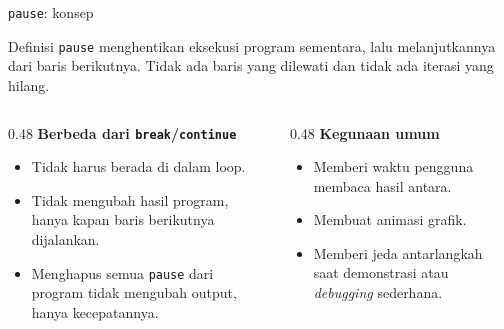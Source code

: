 \documentclass[aspectratio=169,10pt]{beamer}
\newcommand{\kode}[1]{\texttt{#1}}
\begin{document}
\begin{frame}[fragile]{\kode{pause}: konsep}
  \begin{block}{Definisi}
    \kode{pause} menghentikan eksekusi program \alert{sementara}, lalu melanjutkannya dari baris berikutnya.
    Tidak ada baris yang dilewati dan tidak ada iterasi yang hilang.
  \end{block}
  \vspace{4pt}
  \begin{columns}[T]
    \begin{column}{0.48\textwidth}
      \textbf{Berbeda dari \kode{break}/\kode{continue}}
      \begin{itemize}
        \item Tidak harus berada di dalam loop.
        \item Tidak mengubah \alert{hasil} program, hanya \alert{kapan} baris berikutnya dijalankan.
        \item Menghapus semua \kode{pause} dari program tidak mengubah output, hanya kecepatannya.
      \end{itemize}
    \end{column}
    \begin{column}{0.48\textwidth}
      \textbf{Kegunaan umum}
      \begin{itemize}
        \item Memberi waktu pengguna membaca hasil antara.
        \item Membuat animasi grafik.
        \item Memberi jeda antarlangkah saat demonstrasi atau \textit{debugging} sederhana.
      \end{itemize}
    \end{column}
  \end{columns}
\end{frame}
\end{document}
